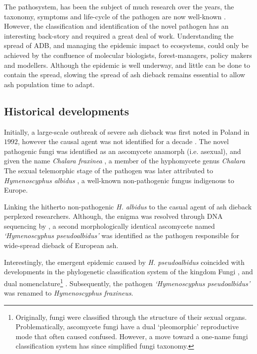 The pathosystem, has been the subject of much research over the years, the taxonomy, symptoms and life-cycle of the pathogen are now well-known \cite{https://doi.org/10.1111/mpp.12073}.
However, the classification and identification of the novel pathogen has an interesting back-story and required a great deal of work.
Understanding the spread of ADB, and managing the epidemic impact to ecosystems, could only be achieved by the confluence of molecular biologists, forest-managers, policy makers and modellers.
Although the epidemic is well underway, and little can be done to contain the spread, slowing the spread of ash dieback remains essential to allow ash population time to adapt.

\subsection{Historical developments}

Initially, a large-scale outbreak of severe ash dieback was first noted in Poland in $1992$, however the causal agent was not identified for a decade \cite{kowalski2001zamieraniu}.
The novel pathogenic fungi was identified as an ascomycete anamorph (i.e. asexual), and given the name \textit{Chalara fraxinea} \cite{kowalski2006chalara}, a member of the hyphomycete genus \textit{Chalara}
The sexual telemorphic stage of the pathogen was later attributed to \textit{Hymenoscyphus albidus} \cite{kowalski2009teleomorph}, a well-known non-pathogenic fungus indigenous to Europe.

Linking the hitherto non-pathogenic \textit{H. albidus} to the casual agent of ash dieback perplexed researchers. 
Although, the enigma was resolved through DNA sequencing by \cite{queloz2011cryptic}, a second morphologically identical ascomycete named \textit{`Hymenoscyphus pseudoalbidus'} was identified as the pathogen responsible for wide-spread dieback of European ash. 

Interestingly, the emergent epidemic caused by \textit{H. pseudoalbidus} coincided with developments in the phylogenetic classification system of the kingdom Fungi \cite{hibbett2007higher}, and dual nomenclature\footnote{Originally, fungi were classified through the structure of their sexual organs. Problematically, ascomycete fungi have a dual `pleomorphic' reproductive mode that often caused confused. However, a move toward a one-name fungi classification system has since simplified fungi taxonomy.} \cite{wingfield2012one}. Subsequently, the pathogen \textit{`Hymenoscyphus pseudoalbidus'} was renamed to \textit{Hymenoscyphus fraxineus}.

